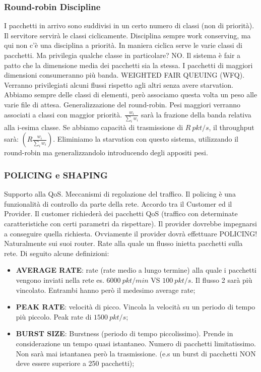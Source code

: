 \subsubsection{Round-robin Discipline}


I pacchetti in arrivo sono suddivisi in un certo numero di classi (non di priorità). Il servitore servirà le classi ciclicamente. Disciplina sempre work conserving, ma qui non c'è una disciplina a priorità. In maniera ciclica serve le varie classi di pacchetti. Ma privilegia qualche classe in particolare? NO. Il sistema è fair a patto che la dimensione media dei pacchetti sia la stessa. I pacchetti di maggiori dimensioni consumeranno più banda. WEIGHTED FAIR QUEUING (WFQ). Verranno privilegiati alcuni flussi rispetto agli altri senza avere starvation. Abbiamo sempre delle classi di elementi, però associamo questa volta un peso alle varie file di attesa. Generalizzazione del round-robin. Pesi maggiori verranno associati a classi con maggior priorità. $\frac{w_i}{\sum_i{w_i}}$ sarà la frazione della banda relativa alla i-esima classe. Se abbiamo capacità di trasmissione di $R\ pkt/s$, il throughput sarà: $(R\frac{w_i}{\sum_i{w_i}})$. Eliminiamo la starvation con questo sistema, utilizzando il round-robin ma generalizzandolo introducendo degli appositi pesi.

\subsubsection{POLICING e SHAPING}

Supporto alla QoS. Meccanismi di regolazione del traffico. Il policing è una funzionalità di controllo da parte della rete. Accordo tra il Customer ed il Provider. Il customer richiederà dei pacchetti QoS (traffico con determinate caratteristiche con certi parametri da rispettare). Il provider dovrebbe impegnarsi a conseguire quella richiesta. Ovviamente il provider dovrà effettuare POLICING! Naturalmente sui suoi router. Rate alla quale un flusso inietta pacchetti sulla rete. Di seguito alcune definizioni:

\begin{itemize}

\item{\textbf{AVERAGE RATE}}: rate (rate medio a lungo termine) alla quale i pacchetti vengono inviati nella rete es. $6000\ pkt/min$ VS $100\ pkt/s$. Il flusso 2 sarà più vincolato. Entrambi hanno però il medesimo average rate;
\item{\textbf{PEAK RATE}}: velocità di picco. Vincola la velocità su un periodo di tempo più piccolo. Peak rate di $1500\ pkt/s$;
\item{\textbf{BURST SIZE}}: Burstness (periodo di tempo piccolissimo). Prende in considerazione un tempo quasi istantaneo. Numero di pacchetti limitatissimo. Non sarà mai istantanea però la trasmissione. (e.s un burst di pacchetti NON deve essere superiore a 250 pacchetti);
\end{itemize}

